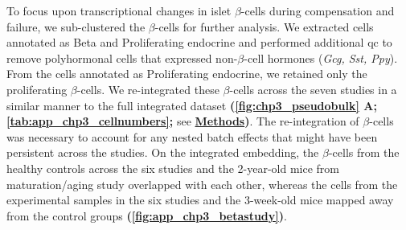 \par To focus upon transcriptional changes in islet $\beta$-cells during compensation and failure, we sub-clustered the $\beta$-cells for further analysis. We extracted cells annotated as Beta and Proliferating endocrine and performed additional \gls{qc} to remove polyhormonal cells that expressed non-$\beta$-cell hormones (\textit{Gcg, Sst, Ppy}). From the cells annotated as Proliferating endocrine, we retained only the proliferating $\beta$-cells. We re-integrated these $\beta$-cells across the seven studies in a similar manner to the full integrated dataset \textbf{(\autoref{fig:chp3_pseudobulk} A; \autoref{tab:app_chp3_cellnumbers};} see \hyperref[subsubsec:met_chp3_betareint]{\textbf{Methods}}\textbf{)}. The re-integration of $\beta$-cells was necessary to account for any nested batch effects that might have been persistent across the studies. On the integrated embedding, the $\beta$-cells from the healthy controls across the six studies and the 2-year-old mice from maturation/aging study overlapped with each other, whereas the cells from the experimental samples in the six studies and the 3-week-old mice mapped away from the control groups \textbf{(\autoref{fig:app_chp3_betastudy})}.\\

